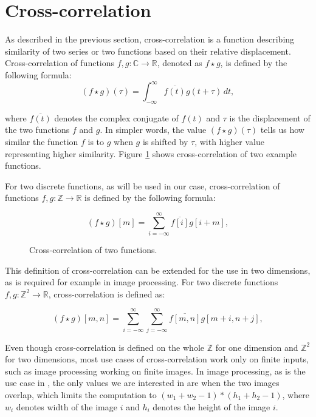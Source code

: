 
\section{Cross-correlation}
\label{sec:cross-corr}

As described in the previous section, cross-correlation is a function describing similarity of two series or two functions based on their relative displacement. Cross-correlation of functions $f,g: \mathbb{C} \rightarrow \mathbb{R}$, denoted as \(f \star g\), is defined by the following formula:
\[
	(f \star g)(\tau) = \int_{-\infty}^{\infty} \overline{f(t)}g(t + \tau) \,dt,
\] 

where \(\overline{f(t)}\) denotes the complex conjugate of \(f(t)\) and \(\tau\) is the displacement of the two functions \(f\) and \(g\). In simpler words, the value \((f \star g)(\tau)\) tells us how similar the function \(f\) is to \(g\) when \(g\) is shifted by \(\tau\), with higher value representing higher similarity. Figure \ref{fig:cross_corr_example} shows cross-correlation of two example functions.


For two discrete functions, as will be used in our case, cross-correlation of functions \( f, g : \mathbb{Z} \rightarrow \mathbb{R} \) is defined by the following formula:

\[
(f \star g)[m] = \sum_{i=-\infty}^{\infty} \overline{f[i]}g[i + m],
\] 

\begin{figure}[h]
	\centering
	\def\svgwidth{0.8\textwidth}
	
	\caption{Cross-correlation of two functions. \cite{pic:crosscorr}}
	\label{fig:cross_corr_example}
\end{figure}

This definition of cross-correlation can be extended for the use in two dimensions, as is required for example in image processing.
For two discrete functions \( f, g : \mathbb{Z}^2 \rightarrow \mathbb{R} \), cross-correlation is defined as:

\[
(f \star g)[m,n] = \sum_{i=-\infty}^{\infty} \sum_{j=-\infty}^{\infty} \overline{f[m,n]}g[m + i,n + j],
\]

Even though cross-correlation is defined on the whole $\mathbb{Z}$ for one dimension and $\mathbb{Z}^2$ for two dimensions, most use cases of cross-correlation work only on finite inputs, such as image processing working on finite images. In image processing, as is the use case in \citep{misko}, the only values we are interested in are when the two images overlap, which limits the computation to $(w_1 + w_2 - 1) * (h_1 + h_2 - 1)$, where $w_i$ denotes width of the image $i$ and $h_i$ denotes the height of the image $i$.

